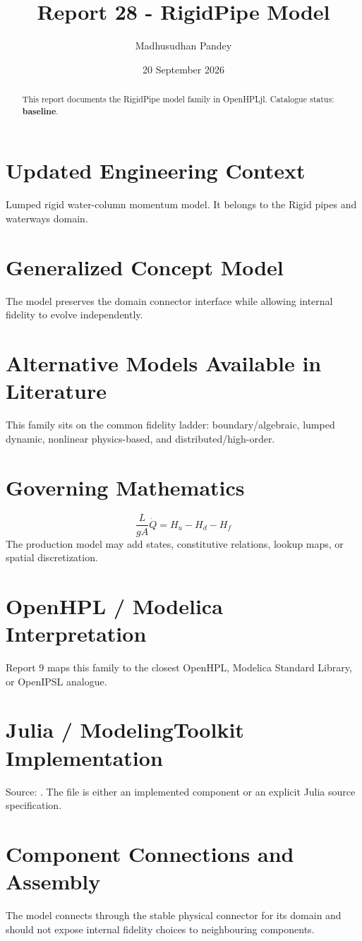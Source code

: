 \documentclass[10pt,a4paper]{article}
\title{Report 28 - RigidPipe Model}
\author{Madhusudhan Pandey}
\date{20 September 2026}
\begin{document}
\maketitle
\begin{abstract}This report documents the RigidPipe model family in OpenHPLjl. Catalogue status: \textbf{baseline}.\end{abstract}
\section{Updated Engineering Context}Lumped rigid water-column momentum model. It belongs to the Rigid pipes and waterways domain.
\section{Generalized Concept Model}The model preserves the domain connector interface while allowing internal fidelity to evolve independently.
\section{Alternative Models Available in Literature}This family sits on the common fidelity ladder: boundary/algebraic, lumped dynamic, nonlinear physics-based, and distributed/high-order.
\section{Governing Mathematics}\[\frac{L}{gA}\dot Q=H_u-H_d-H_f\]The production model may add states, constitutive relations, lookup maps, or spatial discretization.
\section{OpenHPL / Modelica Interpretation}Report 9 maps this family to the closest OpenHPL, Modelica Standard Library, or OpenIPSL analogue.
\section{Julia / ModelingToolkit Implementation}Source: \texttt{}. The file is either an implemented component or an explicit Julia source specification.
\section{Component Connections and Assembly}The model connects through the stable physical connector for its domain and should not expose internal fidelity choices to neighbouring components.
\end{document}
